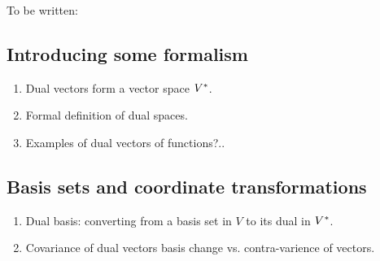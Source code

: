 To be written:

\subsection{Introducing some formalism}
\begin{enumerate}
    \item Dual vectors form a vector space $V^{*}$.
    \item Formal definition of dual spaces.
    \item Examples of dual vectors of functions?..
\end{enumerate}

\subsection{Basis sets and coordinate transformations}
\begin{enumerate}
    \item Dual basis: converting from a basis set in $V$ to its dual in $V^{*}$.
    \item Covariance of dual vectors basis change vs. contra-varience of vectors.
\end{enumerate}

